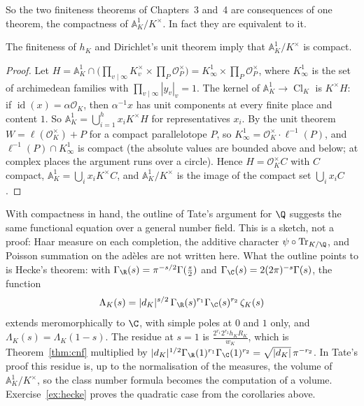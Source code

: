 So the two finiteness theorems of Chapters~3 and~4 are consequences of one theorem, the compactness of $\mathbb{A}_K^1/K^\times$. In fact they are
equivalent to it.

\begin{proposition}\label{prop:fujisakiconverse}
The finiteness of $h_K$ and Dirichlet's unit theorem imply that $\mathbb{A}_K^1/K^\times$ is compact.
\end{proposition}
\begin{proof}
Let $H=\mathbb{A}_K^1\cap\bigl(\prod_{v\mid\infty}K_v^\times\times\prod_P\mathcal O_P^\times\bigr)=K_\infty^1\times\prod_P\mathcal O_P^\times$, where $K_\infty^1$ is the set of
archimedean families with $\prod_{v\mid\infty}|y_v|_v=1$. The kernel of $\mathbb{A}_K^1\to\operatorname{Cl}_K$ is $K^\times H$: if $\operatorname{id}(x)=\alpha\mathcal O_K$, then
$\alpha^{-1}x$ has unit components at every finite place and content $1$. So $\mathbb{A}_K^1=\bigcup_{i=1}^{h}x_iK^\times H$ for representatives $x_i$. By the unit
theorem $W=\ell(\mathcal O_K^\times)+P$ for a compact parallelotope $P$, so $K_\infty^1=\mathcal O_K^\times\cdot\ell^{-1}(P)$, and $\ell^{-1}(P)\cap K_\infty^1$ is
compact (the absolute values are bounded above and below; at complex places the argument runs over a circle). Hence $H=\mathcal O_K^\times C$ with $C$ compact,
$\mathbb{A}_K^1=\bigcup_ix_iK^\times C$, and $\mathbb{A}_K^1/K^\times$ is the image of the compact set $\bigcup_ix_iC$.
\end{proof}

\begin{remark}
With compactness in hand, the outline of Tate's argument for $\Q$ suggests the same functional equation over a general number field. This is a sketch, not a proof: Haar measure on each completion, the additive character $\psi\circ\operatorname{Tr}_{K/\Q}$, and Poisson summation on the ad\`eles are not written here. What the outline points to is
Hecke's theorem: with $\Gamma_\R(s)=\pi^{-s/2}\Gamma(\frac s2)$ and $\Gamma_\C(s)=2(2\pi)^{-s}\Gamma(s)$, the function
\[
\Lambda_K(s)=|d_K|^{s/2}\,\Gamma_\R(s)^{r_1}\Gamma_\C(s)^{r_2}\,\zeta_K(s)
\]
extends meromorphically to $\C$, with simple poles at $0$ and $1$ only, and $\Lambda_K(s)=\Lambda_K(1-s)$. The residue at $s=1$ is $\frac{2^{r_1}2^{r_2}h_KR_K}{w_K}$,
which is Theorem~\ref{thm:cnf} multiplied by $|d_K|^{1/2}\Gamma_\R(1)^{r_1}\Gamma_\C(1)^{r_2}=\sqrt{|d_K|}\,\pi^{-r_2}$. In Tate's proof this residue is, up to the normalisation of the measures, the volume of
$\mathbb{A}_K^1/K^\times$, so the class number formula becomes the computation of a volume. Exercise~\ref{ex:hecke} proves the quadratic
case from the corollaries above.
\end{remark}

